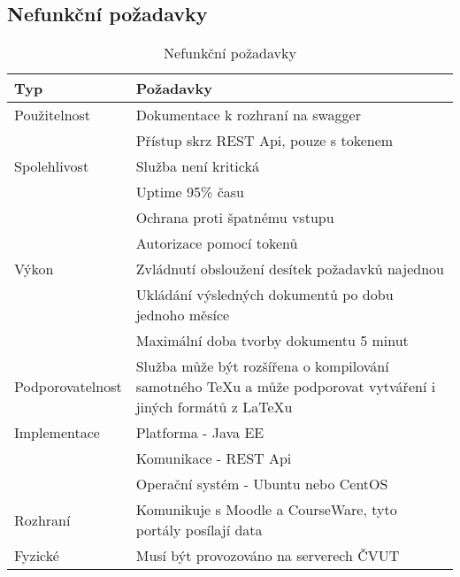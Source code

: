  \subsection{Nefunkční požadavky}
 
 \begin{table}[H]
 	\begin{center}
 		\begin{tabular}{ p{4cm} P{8,6cm} }
 			\textbf{Typ} & \textbf{Požadavky} \\
 			\midrule[0,15em]
 			Použitelnost & \tabitem Dokumentace k rozhraní na swagger \footnotemark \\
 						& \tabitem Přístup skrz REST Api, pouze s tokenem\\
 			\midrule		
 			Spolehlivost & \tabitem Služba není kritická\\
 						& \tabitem Uptime 95\% času\\ 
 						& \tabitem Ochrana proti špatnému vstupu\\
 						& \tabitem Autorizace pomocí tokenů\\
 			\midrule
 			Výkon & \tabitem Zvládnutí obsloužení desítek požadavků najednou\\
 						& \tabitem Ukládání výsledných dokumentů po dobu jednoho měsíce\\
 						& \tabitem Maximální doba tvorby dokumentu 5 minut\\	
			\midrule
			Podporovatelnost & \tabitem Služba může být rozšířena o kompilování samotného TeXu a může podporovat vytváření i jiných formátů z \LaTeX u\\	
			\midrule
			Implementace & \tabitem Platforma - Java EE\\
						& \tabitem Komunikace - REST Api\\
						& \tabitem Operační systém - Ubuntu nebo CentOS\\
			\midrule
 			Rozhraní & \tabitem Komunikuje s Moodle a CourseWare, tyto portály posílají data\\
 			\midrule
 			Fyzické & \tabitem Musí být provozováno na serverech ČVUT\\
 	\end{tabular}
 	\end{center}
 	\caption{Nefunkční požadavky}
 	\label{tab:errors}
 \end{table}
 
